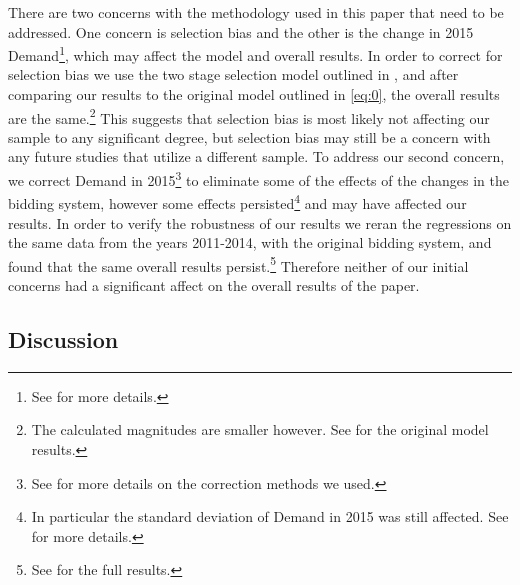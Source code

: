 There are two concerns with the methodology used in this paper that need to be addressed.
One concern is selection bias and the other is the change in 2015 Demand\footnote{See  for more details.}, which may affect the model and overall results.
In order to correct for selection bias we use the two stage selection model outlined in , and after comparing our results to the original model outlined in \eqref{eq:0}, the overall results are the same.\footnote{The calculated magnitudes are smaller however. See  for the original model results.} 
This suggests that selection bias is most likely not affecting our sample to any significant degree, but selection bias may still be a concern with any future studies that utilize a different sample.
To address our second concern, we correct Demand in 2015\footnote{See  for more details on the correction methods we used.} to eliminate some of the effects of the changes in the bidding system, however some effects persisted\footnote{In particular the standard deviation of Demand in 2015 was still affected. See  for more details.} and may have affected our results.
In order to verify the robustness of our results we reran the regressions on the same data from the years 2011-2014, with the original bidding system, and found that the same overall results persist.\footnote{See  for the full results.}
Therefore neither of our initial concerns had a significant affect on the overall results of the paper.

\subsection{Discussion}\label{results:discussion}

